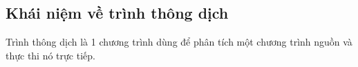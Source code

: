 \subsection{Khái niệm về trình thông dịch}
Trình thông dịch là 1 chương trình dùng để phân tích một chương trình nguồn và thực thi nó trực tiếp.

